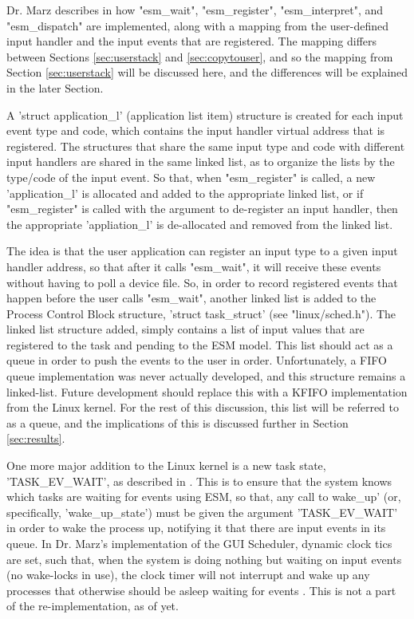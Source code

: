 \documentclass[10pt,journal,compsoc]{IEEEtran}
\begin{document}
Dr. Marz describes in \cite{Marz_BVZ_ESM} how "esm\_wait", "esm\_register", "esm\_interpret", and "esm\_dispatch" are implemented, along with a mapping from the user-defined input handler and the input events that are registered. The mapping differs between Sections \ref{sec:userstack} and \ref{sec:copytouser}, and so the mapping from Section \ref{sec:userstack} will be discussed here, and the differences will be explained in the later Section.

A 'struct application\_l' (application list item) structure is created for each input event type and code, which contains the input handler virtual address that is registered. The structures that share the same input type and code with different input handlers are shared in the same linked list, as to organize the lists by the type/code of the input event. So that, when "esm\_register" is called, a new 'application\_l' is allocated and added to the appropriate linked list, or if "esm\_register" is called with the argument to de-register an input handler, then the appropriate 'appliation\_l' is de-allocated and removed from the linked list.

The idea is that the user application can register an input type to a given input handler address, so that after it calls "esm\_wait", it will receive these events without having to poll a device file. So, in order to record registered events that happen before the user calls "esm\_wait", another linked list is added to the Process Control Block structure, 'struct task\_struct' (see "linux/sched.h"). The linked list structure added, simply contains a list of input values that are registered to the task and pending to the ESM model. This list should act as a queue in order to push the events to the user in order. Unfortunately, a FIFO queue implementation was never actually developed, and this structure remains a linked-list. Future development should replace this with a KFIFO implementation from the Linux kernel. For the rest of this discussion, this list will be referred to as a queue, and the implications of this is discussed further in Section \ref{sec:results}.

One more major addition to the Linux kernel is a new task state, 'TASK\_EV\_WAIT', as described in \cite{Marz_BVZ_ESM}. This is to ensure that the system knows which tasks are waiting for events using ESM, so that, any call to wake\_up' (or, specifically, 'wake\_up\_state') must be given the argument 'TASK\_EV\_WAIT' in order to wake the process up, notifying it that there are input events in its queue. In Dr. Marz's implementation of the GUI Scheduler, dynamic clock tics are set, such that, when the system is doing nothing but waiting on input events (no wake-locks in use), the clock timer will not interrupt and wake up any processes that otherwise should be asleep waiting for events \cite{Marz2018ReducingPC}. This is not a part of the re-implementation, as of yet.
\end{document}
